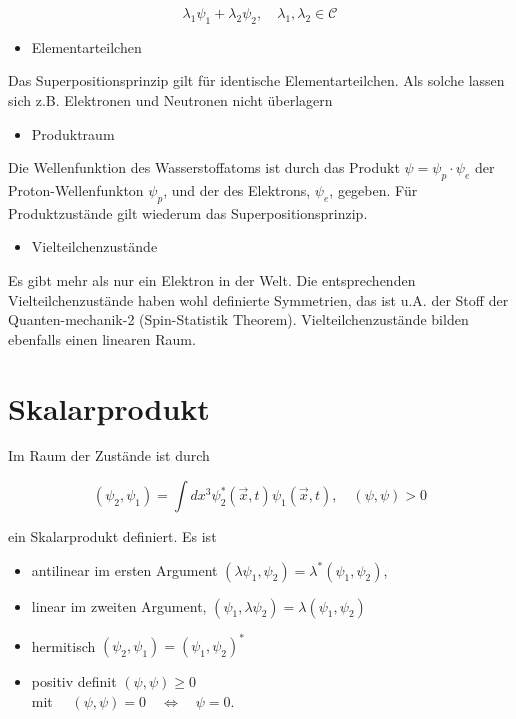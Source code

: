 \documentclass[10pt, letterpaper]{article}
\begin{document}
$$
\lambda_{1} \psi_{1}+\lambda_{2} \psi_{2}, \quad \lambda_{1}, \lambda_{2} \in \mathcal{C}
$$

\begin{itemize}
  \item Elementarteilchen
\end{itemize}

Das Superpositionsprinzip gilt für identische Elementarteilchen. Als solche lassen sich z.B. Elektronen und Neutronen nicht überlagern

\begin{itemize}
  \item Produktraum
\end{itemize}

Die Wellenfunktion des Wasserstoffatoms ist durch das Produkt $\psi=\psi_{p} \cdot \psi_{e}$ der Proton-Wellenfunkton $\psi_{p}$, und der des Elektrons, $\psi_{e}$, gegeben. Für Produktzustände gilt wiederum das Superpositionsprinzip.

\begin{itemize}
  \item Vielteilchenzustände
\end{itemize}

Es gibt mehr als nur ein Elektron in der Welt. Die entsprechenden Vielteilchenzustände haben wohl definierte Symmetrien, das ist u.A. der Stoff der Quanten-mechanik-2 (Spin-Statistik Theorem). Vielteilchenzustände bilden ebenfalls einen linearen Raum.

\section*{Skalarprodukt}
Im Raum der Zustände ist durch

$$
\left(\psi_{2}, \psi_{1}\right)=\int d x^{3} \psi_{2}^{*}(\vec{x}, t) \psi_{1}(\vec{x}, t), \quad(\psi, \psi)>0
$$

ein Skalarprodukt definiert. Es ist

\begin{itemize}
  \item antilinear im ersten Argument $\left(\lambda \psi_{1}, \psi_{2}\right)=\lambda^{*}\left(\psi_{1}, \psi_{2}\right)$,
  \item linear im zweiten Argument, $\left(\psi_{1}, \lambda \psi_{2}\right)=\lambda\left(\psi_{1}, \psi_{2}\right)$
  \item hermitisch $\left(\psi_{2}, \psi_{1}\right)=\left(\psi_{1}, \psi_{2}\right)^{*}$
  \item positiv definit $(\psi, \psi) \geq 0$\\
mit $\quad(\psi, \psi)=0 \quad \Leftrightarrow \quad \psi=0$.
\end{itemize}
\end{document}
